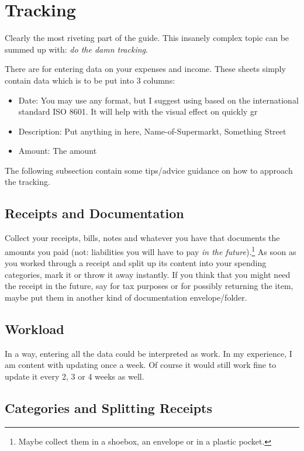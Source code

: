 \section{Tracking}
\label{sec:Tracking}

Clearly the most riveting part of the guide.
This insanely complex topic can be summed up with: \emph{do the damn tracking}.

There are  for entering data on your expenses and income.
These sheets simply contain data which is to be put into 3 columns:
\begin{itemize}
	\item Date: You may use any format, but I suggest using  based on the international standard ISO 8601.
	It will help with the visual effect on quickly gr
	\item Description: Put anything in here, \eg Name-of-Supermarkt, Something Street
	\item Amount: The amount
\end{itemize}

The following subsection contain some tips/advice guidance on how to approach the tracking. 

\subsection{Receipts and Documentation}
\label{subsec:receipts}

Collect your receipts, bills, notes and whatever you have that documents the amounts you paid (not: liabilities you will have to pay \emph{in the future}).\footnote{Maybe collect them in a shoebox, an envelope or in a plastic pocket.}
As soon as you worked through a receipt and split up its content into your spending categories, mark it or throw it away instantly.
If you think that you might need the receipt in the future, say for tax purposes or for possibly returning the item, maybe put them in another kind of documentation envelope/folder.

\subsection{Workload}
\label{subsec:workload}

In a way, entering all the data could be interpreted as work.
In my experience, I am content with updating \tfn once a week.
Of course it would still work fine to update it every 2, 3 or 4 weeks as well.

\subsection{Categories and Splitting Receipts}
\label{subsec:tracking-categories}

